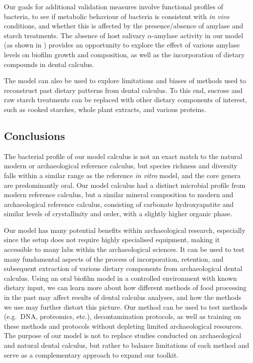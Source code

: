 \documentclass[10pt,a4paper]{article}
\begin{document}
Our goals for additional validation measures involve functional profiles
of bacteria, to see if metabolic behaviour of bacteria is consistent
with \emph{in vivo} conditions, and whether this is affected by the
presence/absence of amylase and starch treatments. The absence of host
salivary \(\alpha\)-amylase activity in our model (as shown in
\citep{bartholdyInvestigatingBiases2022}) provides an opportunity to
explore the effect of various amylase levels on biofilm growth and
composition, as well as the incorporation of dietary compounds in dental
calculus.

The model can also be used to explore limitations and biases of methods
used to reconstruct past dietary patterns from dental calculus. To this
end, sucrose and raw starch treatments can be replaced with other
dietary components of interest, such as cooked starches, whole plant
extracts, and various proteins.

\subsection*{Conclusions}\label{conclusions}

The bacterial profile of our model calculus is not an exact match to the
natural modern or archaeological reference calculus, but species
richness and diversity falls within a similar range as the reference
\emph{in vitro} model, and the core genera are predominantly oral. Our
model calculus had a distinct microbial profile from modern reference
calculus, but a similar mineral composition to modern and archaeological
reference calculus, consisting of carbonate hydroxyapatite and similar
levels of crystallinity and order, with a slightly higher organic phase.

Our model has many potential benefits within archaeological research,
especially since the setup does not require highly specialised
equipment, making it accessible to many labs within the archaeological
sciences. It can be used to test many fundamental aspects of the process
of incorporation, retention, and subsequent extraction of various
dietary components from archaeological dental calculus. Using an oral
biofilm model in a controlled environment with known dietary input, we
can learn more about how different methods of food processing in the
past may affect results of dental calculus analyses, and how the methods
we use may further distort this picture. Our method can be used to test
methods (e.g.~DNA, proteomics, etc.), decontamination protocols, as well
as training on these methods and protocols without depleting limited
archaeological resources. The purpose of our model is not to replace
studies conducted on archaeological and natural dental calculus, but
rather to balance limitations of each method and serve as a
complementary approach to expand our toolkit.
\end{document}
